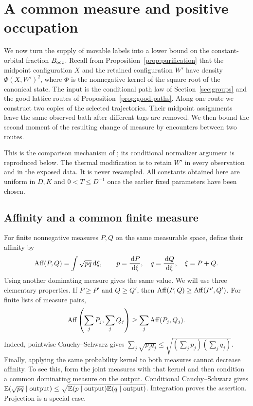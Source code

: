 \section{A common measure and positive occupation}
\label{sec:comparison}

We now turn the supply of movable labels into a lower bound on the
constant-orbital fraction $B_{\rm occ}$. Recall from
Proposition~\ref{prop:purification} that the midpoint configuration $X$ and
the retained configuration $W'$ have density $\Phi(X,W')^2$, where $\Phi$
is the nonnegative kernel of the square root of the canonical state.
The input is the conditional path law of Section~\ref{sec:groups} and the
good lattice routes of Proposition~\ref{prop:good-paths}. Along one route
we construct two copies of the selected trajectories. Their midpoint
assignments leave the same observed bath after different tags are removed.
We then bound the second moment of the resulting change of measure by
encounters between two routes.

This is the comparison mechanism of \citet[Section~8]{HS}; its conditional
normalizer argument is reproduced below. The thermal modification is to
retain $W'$ in every observation and in the exposed data. It is never
resampled. All constants obtained here are uniform in $D,K$ and
$0<T\le D^{-1}$ once the earlier fixed parameters have been chosen.

\subsection{Affinity and a common finite measure}

For finite nonnegative measures $P,Q$ on the same measurable space, define
their affinity by
\[
 \operatorname{Aff}(P,Q)=\int\sqrt{pq}\,\mathrm d\xi,
 \qquad p=\frac{\,\mathrm d P}{\,\mathrm d\xi},\quad q=\frac{\,\mathrm d Q}{\,\mathrm d\xi},
 \quad \xi=P+Q.
\]
Using another dominating measure gives the same value. We will use three
elementary properties. If $P\ge P'$ and $Q\ge Q'$, then
$\operatorname{Aff}(P,Q)\ge\operatorname{Aff}(P',Q')$. For finite lists of measure pairs,
\begin{equation}\label{cmp:affinity-superadditive}
 \operatorname{Aff}\left(\sum_jP_j,\sum_jQ_j\right)
 \ge\sum_j\operatorname{Aff}(P_j,Q_j).
\end{equation}
Indeed, pointwise Cauchy--Schwarz gives
$\sum_j\sqrt{p_jq_j}\le\sqrt{(\sum_jp_j)(\sum_jq_j)}$.
Finally, applying the same probability kernel to both measures cannot decrease
affinity. To see this, form the joint measures with that kernel and then
condition a common dominating measure on the output. Conditional
Cauchy--Schwarz gives
$\mathbb E(\sqrt{pq}\mid\text{output})\le
\sqrt{\mathbb E(p\mid\text{output})\mathbb E(q\mid\text{output})}$.
Integration proves the assertion. Projection is a special case.

